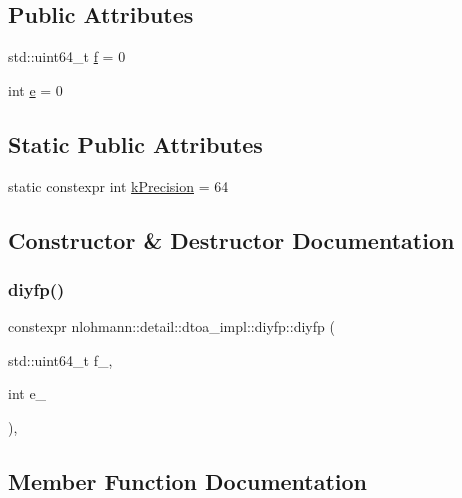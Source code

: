 \subsection*{Public Attributes}
\begin{DoxyCompactItemize}
\item 
std\+::uint64\+\_\+t \mbox{\hyperlink{structnlohmann_1_1detail_1_1dtoa__impl_1_1diyfp_aea90459e340a231ca31d46946803ef51}{f}} = 0
\item 
int \mbox{\hyperlink{structnlohmann_1_1detail_1_1dtoa__impl_1_1diyfp_ae22e170815983961447c429f324c944d}{e}} = 0
\end{DoxyCompactItemize}
\subsection*{Static Public Attributes}
\begin{DoxyCompactItemize}
\item 
static constexpr int \mbox{\hyperlink{structnlohmann_1_1detail_1_1dtoa__impl_1_1diyfp_a03682754b06ed4f30b263119eecc2d52}{k\+Precision}} = 64
\end{DoxyCompactItemize}


\subsection{Constructor \& Destructor Documentation}
\mbox{\label{structnlohmann_1_1detail_1_1dtoa__impl_1_1diyfp_ad8798a8823a49c8412f0fada9892c918}} 
\subsubsection{\texorpdfstring{diyfp()}{diyfp()}}
{\footnotesize\ttfamily constexpr nlohmann\+::detail\+::dtoa\+\_\+impl\+::diyfp\+::diyfp (\begin{DoxyParamCaption}\item[{std\+::uint64\+\_\+t}]{f\+\_\+,  }\item[{int}]{e\+\_\+ }\end{DoxyParamCaption})\hspace{0.3cm}{\ttfamily [inline]}, {\ttfamily [noexcept]}}



\subsection{Member Function Documentation}
\mbox{\label{structnlohmann_1_1detail_1_1dtoa__impl_1_1diyfp_aa5f250d12ce89c81fdb08900c6a823e8}} 
